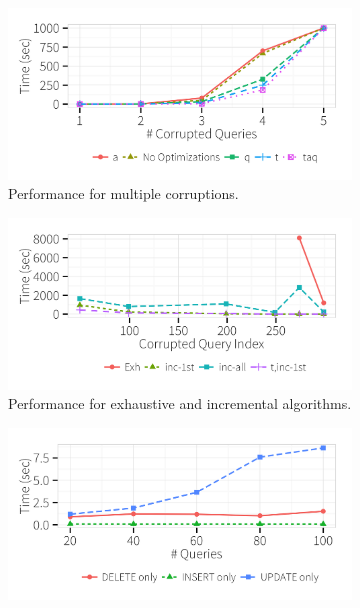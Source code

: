   \begin{figure}[h]
  \centering
    \vspace*{-.2in}
    \begin{subfigure}[t]{.3\textwidth}
    \includegraphics[width = .99\columnwidth]{figures/multi_time}
    \vspace*{-.1in}
    \caption{Performance for multiple corruptions.}
    \label{f:multiquery} 
    \end{subfigure}
    \begin{subfigure}[t]{.3\textwidth}
    \includegraphics[width = .99\columnwidth]{figures/incrementalcompare_time}
    \vspace*{-.1in}
    \caption{Performance for exhaustive and incremental algorithms.}
    \label{f:singlequeryinc_time} 
    \end{subfigure}
    \begin{subfigure}[t]{.3\textwidth}
    \includegraphics[width = .99\columnwidth]{figures/indelup_time}

\end{subfigure}
\end{figure}
